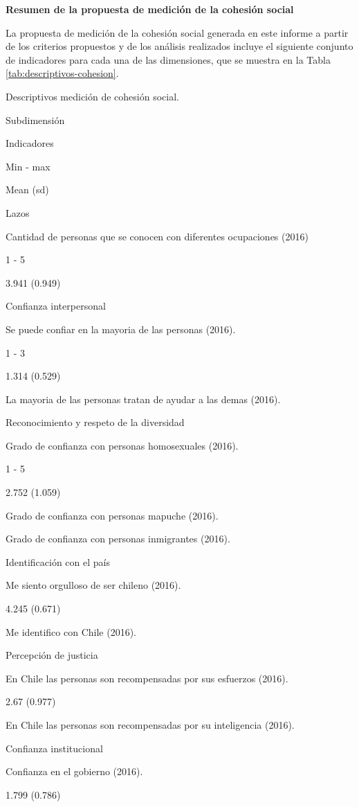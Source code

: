 \documentclass[
  12pt,
]{book}
\begin{document}
\textbf{Resumen de la propuesta de medición de la cohesión social}

La propuesta de medición de la cohesión social generada en este informe a partir de los criterios propuestos y de los análisis realizados incluye el siguiente conjunto de indicadores para cada una de las dimensiones, que se muestra en la Tabla \ref{tab:descriptivos-cohesion}.

\label{tab:descriptivos-cohesion}Descriptivos medición de cohesión social.

Subdimensión

Indicadores

Min - max

Mean (sd)

Lazos

Cantidad de personas que se conocen con diferentes ocupaciones (2016)

1 - 5

3.941 (0.949)

Confianza interpersonal

Se puede confiar en la mayoria de las personas (2016).

1 - 3

1.314 (0.529)

La mayoria de las personas tratan de ayudar a las demas (2016).

Reconocimiento y respeto de la diversidad

Grado de confianza con personas homosexuales (2016).

1 - 5

2.752 (1.059)

Grado de confianza con personas mapuche (2016).

Grado de confianza con personas inmigrantes (2016).

Identificación con el país

Me siento orgulloso de ser chileno (2016).

4.245 (0.671)

Me identifico con Chile (2016).

Percepción de justicia

En Chile las personas son recompensadas por sus esfuerzos (2016).

2.67 (0.977)

En Chile las personas son recompensadas por su inteligencia (2016).

Confianza institucional

Confianza en el gobierno (2016).

1.799 (0.786)
\end{document}
